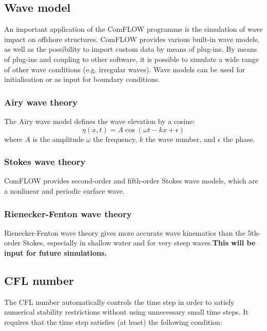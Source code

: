 \subsection{Wave model}
An important application of the ComFLOW programme is the simulation of wave impact on offshore structures. ComFLOW provides various built-in wave models, as well as the possibility to import custom data by means of plug-ins. By means of plug-ins and coupling to other software, it is possible to simulate a wide range of other wave conditions (e.g. irregular waves). Wave models can be used for initialisation or as input for boundary conditions.
\subsubsection{Airy wave theory}
The Airy wave model defines the wave elevation by a cosine:
\begin{equation}
    \eta(x,t) = A\cos(\omega t - kx + \epsilon) 
\end{equation}
where $A$ is the amplitude $\omega$ the frequency, $k$ the wave number, and $\epsilon$ the phase.

\subsubsection{Stokes wave theory}
ComFLOW provides second-order and fifth-order Stokes wave models, which are a nonlinear and periodic surface wave.

\subsubsection{Rienecker-Fenton wave theory}
Rienecker-Fenton wave theory gives more accurate wave kinematics than the 5th-order Stokes, especially in shallow water and for very steep waves.\textbf{This will be input for future simulations.}



\subsection{CFL number}
The CFL number automatically controls the time step in order to satisfy numerical stability restrictions without using unnecessary small time steps. It requires that the time step satisfies (at least) the following condition:


